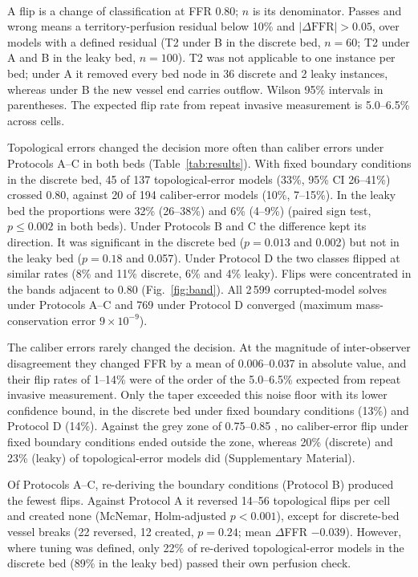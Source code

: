 \documentclass[journal,twoside,web]{ieeecolor}
\begin{document}
\begin{table}[!t]
\begin{tabular}{@{}llrccrcc@{}}
\bottomrule
\end{tabular}
\\[2pt]
\parbox{\textwidth}{\footnotesize A flip is a change of classification at FFR 0.80; $n$ is its denominator. Passes and wrong means a territory-perfusion residual below 10\% and $|\Delta\mathrm{FFR}| > 0.05$, over models with a defined residual (T2 under B in the discrete
bed, $n = 60$; T2 under A and B in the leaky bed, $n = 100$). T2 was not applicable to one instance per bed; under A it removed every bed node in 36 discrete and 2 leaky instances, whereas under B the new vessel end carries outflow. Wilson 95\% intervals in parentheses. The expected flip
rate from repeat invasive measurement is 5.0--6.5\% across cells.}
\end{table}

Topological errors changed the decision more often than caliber errors under Protocols A--C in both beds
(Table~\ref{tab:results}). With fixed boundary conditions in the discrete bed, 45 of 137 topological-error models
(33\%, 95\% CI 26--41\%) crossed 0.80, against 20 of 194 caliber-error models (10\%, 7--15\%). In the leaky bed the
proportions were 32\% (26--38\%) and 6\% (4--9\%) (paired sign test, $p \leq 0.002$ in both beds). Under
Protocols B and C the difference kept its direction. It was significant in the discrete bed
($p = 0.013$ and 0.002) but not in the leaky bed ($p = 0.18$ and 0.057). Under Protocol D the two classes
flipped at similar rates (8\% and 11\% discrete, 6\% and 4\% leaky). Flips were concentrated in the bands adjacent to 0.80 (Fig.~\ref{fig:band}). All 2\,599 corrupted-model solves under Protocols A--C and 769 under Protocol D converged (maximum mass-conservation error $9\times10^{-9}$).

The caliber errors rarely changed the decision. At the magnitude of inter-observer disagreement they changed FFR by
a mean of 0.006--0.037 in absolute value, and their flip rates of 1--14\% were of the order of the 5.0--6.5\%
expected from repeat invasive measurement. Only the taper exceeded this noise floor with its lower confidence bound, in the discrete bed under fixed boundary
conditions (13\%) and Protocol D (14\%). Against the grey zone of 0.75--0.85 \cite{petraco2013}, no caliber-error flip under fixed boundary conditions
ended outside the zone, whereas 20\% (discrete) and 23\% (leaky) of topological-error models did (Supplementary Material).

Of Protocols A--C, re-deriving the boundary conditions (Protocol B) produced the fewest flips. Against Protocol A it reversed 14--56
topological flips per cell and created none (McNemar, Holm-adjusted $p < 0.001$), except for discrete-bed vessel
breaks (22 reversed, 12 created, $p = 0.24$; mean $\Delta$FFR $-0.039$). However, where tuning was defined, only 22\% of re-derived topological-error models in the discrete bed (89\% in the leaky bed) passed their own perfusion check.
\end{document}
